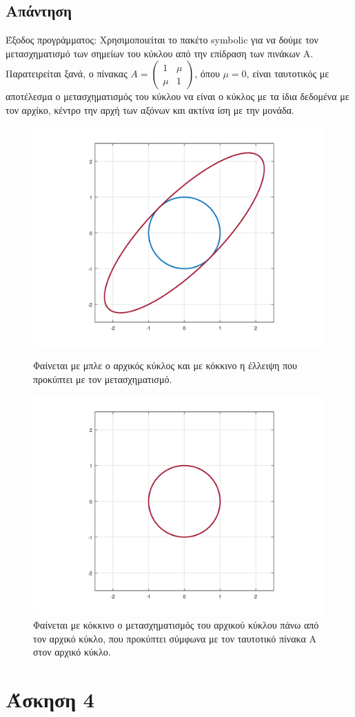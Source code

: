 \documentclass[a4paper,12pt]{article}
\begin{document}
\subsection{Απάντηση}
Έξοδος προγράμματος:
%
Χρησιμοποιείται το πακέτο symbolic για να δούμε τον μετασχηματισμό των σημείων
του κύκλου από την επίδραση των πινάκων Α. Παρατειρείται ξανά, ο πίνακας $
	A = \begin{pmatrix}
		1   & \mu \\
		\mu & 1
	\end{pmatrix}
$, όπου $\mu = 0$, είναι ταυτοτικός με αποτέλεσμα ο μετασχηματισμός του κύκλου
να είναι ο κύκλος με τα ίδια δεδομένα με τον αρχίκο, κέντρο την αρχή των αξόνων
και ακτίνα ίση με την μονάδα.
\begin{figure}
	\centering
	\centering
	\includegraphics[scale=0.5]{a.png}
	\caption{Φαίνεται με μπλε ο αρχικός κύκλος και με κόκκινο η έλλειψη που
		προκύπτει με τον μετασχηματισμό.}
	\includegraphics[scale=0.5]{i.png}
	\caption{Φαίνεται με κόκκινο ο μετασχηματισμός του αρχικού κύκλου πάνω
		από τον αρχικό κύκλο, που προκύπτει σύμφωνα με τον ταυτοτικό πίνακα Α
		στον αρχικό κύκλο.}
\end{figure}
\newpage\section{Άσκηση 4}
\end{document}
